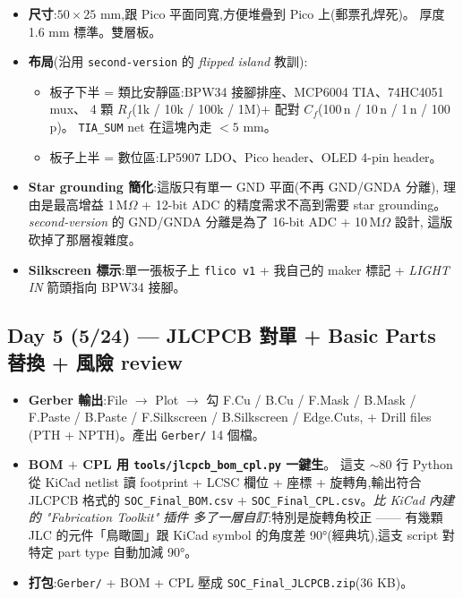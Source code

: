 \begin{itemize}[leftmargin=2em,itemsep=0pt]
  \item \textbf{尺寸}:\(50 \times 25\) mm,跟 Pico 平面同寬,方便堆疊到 Pico 上(郵票孔焊死)。
        厚度 1.6 mm 標準。雙層板。
  \item \textbf{布局}(沿用 \texttt{second-version} 的 \emph{flipped island} 教訓):
        \begin{itemize}[leftmargin=2em,itemsep=0pt]
          \item 板子下半 = 類比安靜區:BPW34 接腳排座、MCP6004 TIA、74HC4051 mux、
                4 顆 \(R_f\)(1k / 10k / 100k / 1M)+ 配對 \(C_f\)(100\,n / 10\,n / 1\,n / 100\,p)。
                \texttt{TIA\_SUM} net 在這塊內走 \(< 5\) mm。
          \item 板子上半 = 數位區:LP5907 LDO、Pico header、OLED 4-pin header。
        \end{itemize}
  \item \textbf{Star grounding 簡化}:這版只有單一 GND 平面(不再 GND/GNDA 分離),
        理由是最高增益 1\,M\(\Omega\) + 12-bit ADC 的精度需求不高到需要 star grounding。
        \emph{second-version} 的 GND/GNDA 分離是為了 16-bit ADC + 10\,M\(\Omega\) 設計,
        這版砍掉了那層複雜度。
  \item \textbf{Silkscreen 標示}:單一張板子上 \texttt{flico v1} + 我自己的 maker 標記 +
        \emph{LIGHT IN} 箭頭指向 BPW34 接腳。
\end{itemize}

\subsection*{Day 5 (5/24) — JLCPCB 對單 + Basic Parts 替換 + 風險 review}

\begin{itemize}[leftmargin=2em,itemsep=0pt]
  \item \textbf{Gerber 輸出}:File \(\to\) Plot \(\to\) 勾 F.Cu / B.Cu / F.Mask / B.Mask /
        F.Paste / B.Paste / F.Silkscreen / B.Silkscreen / Edge.Cuts,
        + Drill files (PTH + NPTH)。產出 \texttt{Gerber/} 14 個檔。
  \item \textbf{BOM \(+\) CPL 用 \texttt{tools/jlcpcb\_bom\_cpl.py} 一鍵生}。
        這支 \(\sim 80\) 行 Python 從 KiCad netlist 讀 footprint + LCSC 欄位 +
        座標 + 旋轉角,輸出符合 JLCPCB 格式的 \texttt{SOC\_Final\_BOM.csv} \(+\)
        \texttt{SOC\_Final\_CPL.csv}。\emph{比 KiCad 內建的 "Fabrication Toolkit" 插件
        多了一層自訂}:特別是旋轉角校正 —— 有幾顆 JLC 的元件「鳥瞰圖」跟 KiCad
        symbol 的角度差 90°(經典坑),這支 script 對特定 part type 自動加減 90°。
  \item \textbf{打包}:\texttt{Gerber/} + BOM + CPL 壓成 \texttt{SOC\_Final\_JLCPCB.zip}(36 KB)。
\end{itemize}

